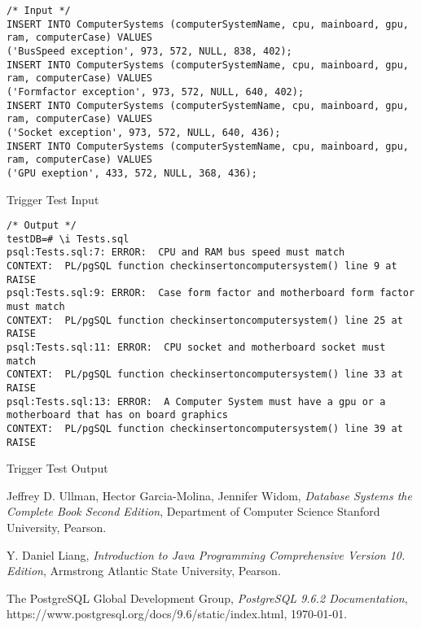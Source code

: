 \documentclass[12pt,a4paper]{article}
\begin{document}
\begin{listing}[!htbp]
\begin{verbatim}
/* Input */
INSERT INTO ComputerSystems (computerSystemName, cpu, mainboard, gpu, ram, computerCase) VALUES
('BusSpeed exception', 973, 572, NULL, 838, 402);
INSERT INTO ComputerSystems (computerSystemName, cpu, mainboard, gpu, ram, computerCase) VALUES
('Formfactor exception', 973, 572, NULL, 640, 402);
INSERT INTO ComputerSystems (computerSystemName, cpu, mainboard, gpu, ram, computerCase) VALUES
('Socket exception', 973, 572, NULL, 640, 436);
INSERT INTO ComputerSystems (computerSystemName, cpu, mainboard, gpu, ram, computerCase) VALUES
('GPU exeption', 433, 572, NULL, 368, 436);
\end{verbatim}
\caption{Trigger Test Input}
\label{input}
\end{listing}

\begin{listing}[!htbp]
\begin{verbatim}
/* Output */
testDB=# \i Tests.sql 
psql:Tests.sql:7: ERROR:  CPU and RAM bus speed must match
CONTEXT:  PL/pgSQL function checkinsertoncomputersystem() line 9 at RAISE
psql:Tests.sql:9: ERROR:  Case form factor and motherboard form factor must match
CONTEXT:  PL/pgSQL function checkinsertoncomputersystem() line 25 at RAISE
psql:Tests.sql:11: ERROR:  CPU socket and motherboard socket must match 
CONTEXT:  PL/pgSQL function checkinsertoncomputersystem() line 33 at RAISE
psql:Tests.sql:13: ERROR:  A Computer System must have a gpu or a motherboard that has on board graphics
CONTEXT:  PL/pgSQL function checkinsertoncomputersystem() line 39 at RAISE

\end{verbatim}
\caption{Trigger Test Output}
\label{output}
\end{listing}

\begin{thebibliography}{9}

    Jeffrey D. Ullman, Hector Garcia-Molina, Jennifer Widom,
    \emph{Database Systems the Complete Book Second Edition},
    Department of Computer Science Stanford University,
    Pearson.

    Y. Daniel Liang,
    \emph{Introduction to Java Programming Comprehensive Version 10. Edition},
    Armstrong Atlantic State University,
    Pearson.
    
    The PostgreSQL Global Development Group, 
    \emph{PostgreSQL 9.6.2 Documentation}, 
    https://www.postgresql.org/docs/9.6/static/index.html, 
    \today.

\end{thebibliography}
\listoffigures
\listoflistings
\end{document}
